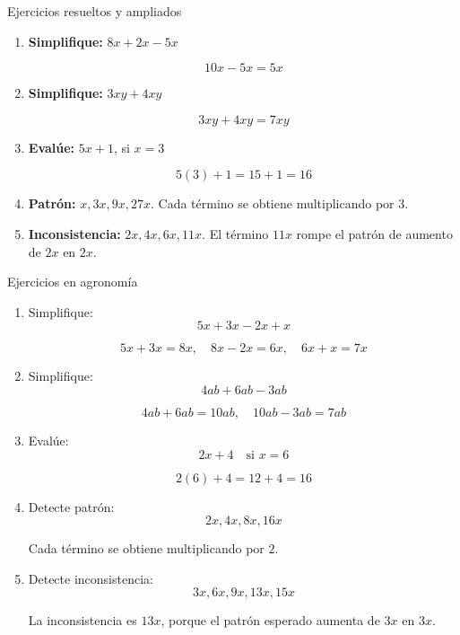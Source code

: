 \documentclass[aspectratio=169,12pt]{beamer}
\begin{document}
	\begin{frame}{Ejercicios resueltos y ampliados}
		\small
		\begin{enumerate}
			\item \textbf{Simplifique:} \(8x+2x-5x\)
			
			\pause
			\[
			10x-5x=5x
			\]
			
			\pause
			\item \textbf{Simplifique:} \(3xy+4xy\)
			
			\pause
			\[
			3xy+4xy=7xy
			\]
			
			\pause
			\item \textbf{Evalúe:} \(5x+1\), si \(x=3\)
			
			\pause
			\[
			5(3)+1=15+1=16
			\]
			
			\pause
			\item \textbf{Patrón:} \(x,3x,9x,27x\). \pause Cada término se obtiene multiplicando por \(3\).
			
			\pause
			\item \textbf{Inconsistencia:} \(2x,4x,6x,11x\). \pause
			El término \(11x\) rompe el patrón de aumento de \(2x\) en \(2x\).
		\end{enumerate}
	\end{frame}
	
	\begin{frame}{Ejercicios en agronomía}
		\small
		\begin{enumerate}
			\item Simplifique:
			\[
			5x+3x-2x+x
			\]
			
			\pause
			\[
			5x+3x=8x,\quad 8x-2x=6x,\quad 6x+x=7x
			\]
			
			\pause
			\item Simplifique:
			\[
			4ab+6ab-3ab
			\]
			
			\pause
			\[
			4ab+6ab=10ab,\quad 10ab-3ab=7ab
			\]
			
			\pause
			\item Evalúe:
			\[
			2x+4 \quad \text{si } x=6
			\]
			
			\pause
			\[
			2(6)+4=12+4=16
			\]
			
			\pause
			\item Detecte patrón:
			\[
			2x,4x,8x,16x
			\]
			
			\pause
			Cada término se obtiene multiplicando por \(2\).
			
			\pause
			\item Detecte inconsistencia:
			\[
			3x,6x,9x,13x,15x
			\]
			
			\pause
			La inconsistencia es \(13x\), porque el patrón esperado aumenta de \(3x\) en \(3x\).
		\end{enumerate}
	\end{frame}
	
\end{document}
